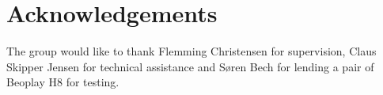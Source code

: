 \section*{Acknowledgements}
The group would like to thank Flemming Christensen for supervision, Claus Skipper Jensen for technical assistance and Søren Bech for lending a pair of Beoplay H8 for testing. 
